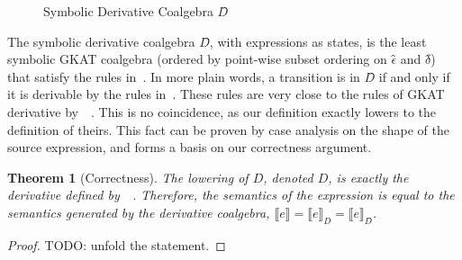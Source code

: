\documentclass[conference]{IEEEtran}
\newtheorem{theorem}{Theorem}
\newcommand\altxrightarrow[2][0pt]{\mathrel{\ensurestackMath{\stackengine%
  {\dimexpr#1-7.5pt}{\xrightarrow{\phantom{#2}}}{\scriptstyle\!#2\,}%
  {O}{c}{F}{F}{S}}}}
\newcommand{\transvia}[1]{
    \mathrel{\raisebox{-2px}{\(\altxrightarrow[-2px]{#1}\)}}
}
\newcommand{\transAcc}[2]{⇒_{#1} #2}
\begin{document}
\begin{figure*}
    \caption{Symbolic Derivative Coalgebra \(D̂\)}\label{fig:derivatives-rules}
\end{figure*}

The symbolic derivative coalgebra \(D̂\), with expressions as states, is the least symbolic GKAT coalgebra (ordered by point-wise subset ordering on \(ϵ̂\) and \(δ̂\)) that satisfy the rules in~.
In more plain words, a transition is in \(D̂\) if and only if it is derivable by the rules in~.
These rules are very close to the rules of GKAT derivative by~\citeauthor{schmid_GuardedKleeneAlgebra_2021}~\cite{schmid_GuardedKleeneAlgebra_2021}.
This is no coincidence, as our definition exactly lowers to the definition of theirs.
This fact can be proven by case analysis on the shape of the source expression, and forms a basis on our correctness argument.
\begin{theorem}[Correctness]\label{thm:derivative-correctness}
    The lowering of \(D̂\), denoted \(D\), is exactly the derivative defined by~\citeauthor{schmid_GuardedKleeneAlgebra_2021}~\cite{schmid_GuardedKleeneAlgebra_2021}.
    Therefore, the semantics of the expression is equal to the semantics generated by the derivative coalgebra, \(⟦e⟧ = ⟦e⟧_{D} = ⟦e⟧_{D̂}\).
\end{theorem}
\begin{proof}
    TODO: unfold the statement.
\end{proof}
\end{document}
